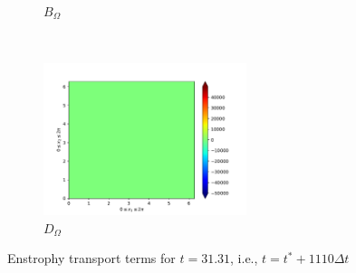 \begin{figure}[H]
\begin{subfigure}{0.45\textwidth}
        \caption{$B_{\Omega}$}
    \end{subfigure}
    ~
    \begin{subfigure}{0.45\textwidth}
        \includegraphics[height=1.75in]{media/run-cds-65-25k/D-enst-449}
        \caption{$D_{\Omega}$}
    \end{subfigure}
    \caption{Enstrophy transport terms for $t=31.31$, i.e., $t=t^{\ast} + 1110 \Delta t$}
\end{figure}

\newpage


